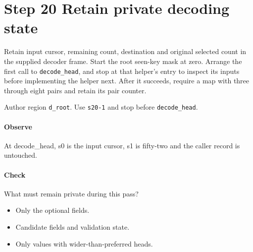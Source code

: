 \section{Step 20 Retain private decoding state}\label{cbor-s20}
Retain input cursor, remaining count, destination and original selected count in the supplied decoder frame. Start the root seen-key mask at zero. Arrange the first call to \texttt{decode\_head}, and stop at that helper's entry to inspect its inputs before implementing the helper next. After it succeeds, require a map with three through eight pairs and retain its pair counter.

Author region \texttt{d\_root}. Use \texttt{s20-1} and stop before \texttt{decode\_head}.

\paragraph{Observe} At decode\_head, s0 is the input cursor, s1 is fifty-two and the caller record is untouched.

\paragraph{Check} What must remain private during this pass?
\begin{itemize}
  \item[A.] Only the optional fields.
  \item[B.] Candidate fields and validation state.
  \item[C.] Only values with wider-than-preferred heads.
\end{itemize}
